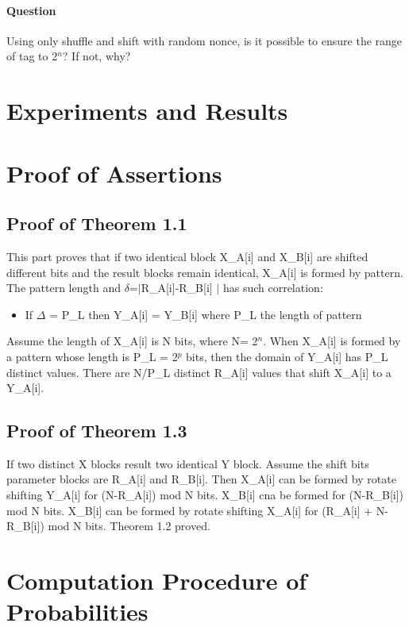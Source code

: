 \documentclass{article}
\begin{document}
\paragraph{Question}
Using only shuffle and shift with random nonce, is it possible to ensure the range of tag to 2$^n$? If not, why?

\section{Experiments and Results}
\appendix
\section{Proof of Assertions}
\subsection{Proof of Theorem 1.1}
This part proves that if two identical block X\_A[i]  and X\_B[i] are shifted different bits and the result blocks remain identical, X\_A[i] is formed by pattern. The pattern length and $\delta$=$\mid$R\_A[i]-R\_B[i] $\mid$ has such correlation:
\begin{itemize}
	\item If $\Delta$ = P\_L then Y\_A[i] = Y\_B[i] where P\_L the length of pattern
\end{itemize}
Assume the length of X\_A[i] is N bits, where N= 2$^n$. When X\_A[i] is formed by a pattern whose length is P\_L = 2$^p$ bits, then the domain of Y\_A[i] has P\_L distinct values. There are N/P\_L distinct R\_A[i] values that shift X\_A[i] to a Y\_A[i].  

\subsection{Proof of Theorem 1.3}
If two distinct X blocks result two identical Y block. Assume the shift bits parameter blocks are R\_A[i] and R\_B[i]. Then X\_A[i] can be formed by rotate shifting Y\_A[i] for (N-R\_A[i]) mod N bits. X\_B[i] cna be formed for (N-R\_B[i]) mod N bits.
X\_B[i] can be formed by rotate shifting X\_A[i] for (R\_A[i] + N-R\_B[i]) mod N bits. Theorem 1.2 proved.

\section{Computation Procedure of Probabilities}
\end{document}
